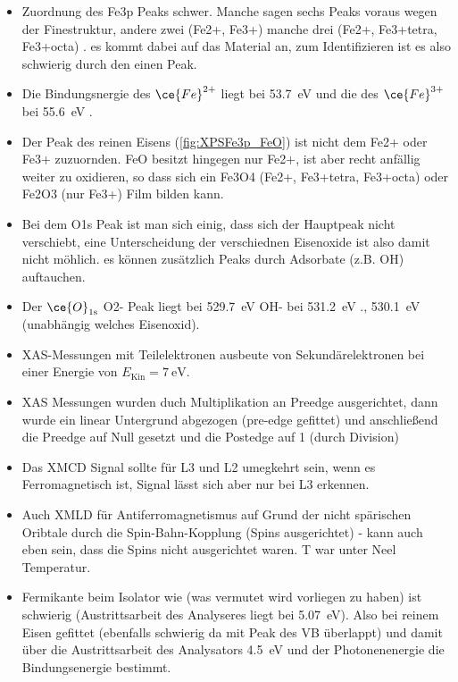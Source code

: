             \begin{itemize}
                \item Zuordnung des Fe3p Peaks schwer. Manche sagen sechs Peaks voraus \cite{FeO_14, FeO_17, FeO_15} wegen der Finestruktur, andere zwei (Fe2+, Fe3+) \cite{FeO_15, FeO_11, FeO_10, FeO_7} manche drei (Fe2+, Fe3+tetra, Fe3+octa) \cite{FeO_12}. es kommt dabei auf das Material an, zum Identifizieren ist es also schwierig durch den einen Peak.
                \item Die Bindungsnergie des $\ce{Fe}^{2+}$ liegt bei \SI{53.7}{\electronvolt} und die des $\ce{Fe}^{3+}$ bei \SI{55.6}{\electronvolt} \cite{FeO_7}.
                \item Der Peak des reinen Eisens (\autoref{fig:XPSFe3p_FeO}) ist nicht dem Fe2+ oder Fe3+ zuzuornden. FeO besitzt hingegen nur Fe2+, ist aber recht anfällig weiter zu oxidieren, so dass sich ein Fe3O4 (Fe2+, Fe3+tetra, Fe3+octa) oder Fe2O3 (nur Fe3+) Film bilden kann. 
                \item Bei dem O1s Peak ist man sich einig, dass sich der Hauptpeak nicht verschiebt, eine Unterscheidung der verschiednen Eisenoxide ist also damit nicht möhlich. es können zusätzlich Peaks durch Adsorbate (z.B. OH) auftauchen.
                \item Der  $\ce{O}_{1\text{s}}$ O2- Peak liegt bei \SI{529.7}{\electronvolt} \cite{FeO_9} OH- bei \SI{531.2}{\electronvolt} \cite{FeO_9}., \SI{530.1}{\electronvolt} \cite{FeO_15} (unabhängig welches Eisenoxid).
                \item XAS-Messungen mit Teilelektronen ausbeute von Sekundärelektronen bei einer Energie von $E_\text{Kin} = \SI{7}{\electronvolt}$.
                \item XAS Messungen wurden duch Multiplikation an Preedge ausgerichtet, dann wurde ein linear Untergrund abgezogen (pre-edge gefittet) und anschließend die Preedge auf Null gesetzt und die Postedge auf 1 (durch Division)
                \item Das XMCD Signal sollte für L3 und L2 umegkehrt sein, wenn es Ferromagnetisch ist, Signal lässt sich aber nur bei L3 erkennen.
                \item Auch XMLD für Antiferromagnetismus auf Grund der nicht spärischen Oribtale durch die Spin-Bahn-Kopplung (Spins ausgerichtet) \cite{stohr_magnetism_2006} - kann auch eben sein, dass die Spins nicht ausgerichtet waren. T war unter Neel Temperatur.
                \item Fermikante beim Isolator wie  (was vermutet wird vorliegen zu haben) ist schwierig (Austrittsarbeit des Analyseres liegt bei \SI{5.07}{\electronvolt}). Also bei reinem Eisen gefittet (ebenfalls schwierig da mit Peak des VB überlappt) und damit über die Austrittsarbeit des Analysators \SI{4.5}{\electronvolt} und der Photonenenergie die Bindungsenergie bestimmt.

\end{itemize}
